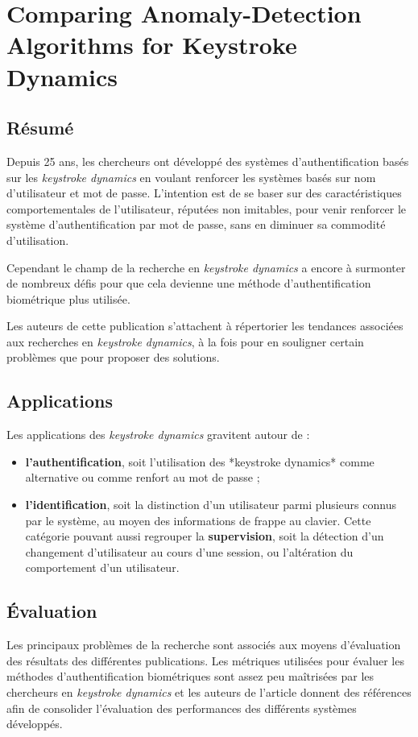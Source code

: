 \section{Comparing Anomaly-Detection Algorithms for Keystroke Dynamics\cite{peacock2004}}


\subsection{Résumé}
Depuis 25 ans, les chercheurs ont développé des systèmes d'authentification basés sur les  \textit{keystroke dynamics} en voulant renforcer les systèmes basés sur nom d'utilisateur et mot de passe. L'intention est de se baser sur des caractéristiques comportementales de l'utilisateur, réputées non imitables, pour venir renforcer le système d'authentification par mot de passe, sans en diminuer sa commodité d'utilisation.

Cependant le champ de la recherche en \textit{keystroke dynamics} a encore à surmonter de nombreux défis pour que cela devienne une méthode d'authentification biométrique plus utilisée.

Les auteurs de cette publication s'attachent à répertorier les tendances associées aux recherches en \textit{keystroke dynamics}, à la fois pour en souligner certain problèmes que pour proposer des solutions.

\subsection{Applications}
Les applications des \textit{keystroke dynamics} gravitent autour de :

\begin{itemize}
	\item \textbf{l'authentification}, soit l'utilisation des *keystroke dynamics* comme alternative ou comme renfort au mot de passe ;
	\item \textbf{l'identification}, soit la distinction d'un utilisateur parmi plusieurs connus par le système, au moyen des informations de frappe au clavier. Cette catégorie pouvant aussi regrouper la \textbf{supervision}, soit la détection d'un changement d'utilisateur au cours d'une session, ou l'altération du comportement d'un utilisateur.
\end{itemize}

\subsection{Évaluation}
Les principaux problèmes de la recherche sont associés aux moyens d'évaluation des résultats des différentes publications. Les métriques utilisées pour évaluer les méthodes d'authentification biométriques sont assez peu maîtrisées par les chercheurs en \textit{keystroke dynamics} et les auteurs de l'article donnent des références afin de consolider l'évaluation des performances des différents systèmes développés.

